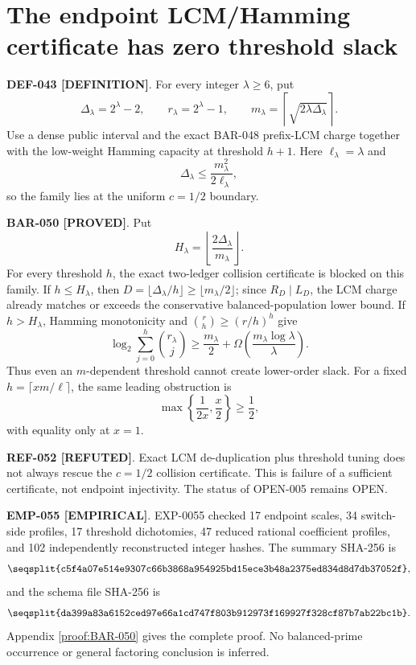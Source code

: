 \documentclass[11pt]{article}
\newcommand{\claimstatus}[2]{\textbf{#1 [#2]}}
\begin{document}
\section{The endpoint LCM/Hamming certificate has zero threshold slack}

\claimstatus{DEF-043}{DEFINITION}. For every integer \(\lambda\ge6\), put
\[
\Delta_\lambda=2^\lambda-2,\qquad
r_\lambda=2^\lambda-1,\qquad
m_\lambda=\left\lceil\sqrt{2\lambda\Delta_\lambda}\right\rceil.
\tag{M57.1}
\]
Use a dense public interval and the exact BAR-048 prefix-LCM charge together
with the low-weight Hamming capacity at threshold \(h+1\). Here
\(\ell_\lambda=\lambda\) and
\[
\Delta_\lambda\le\frac{m_\lambda^2}{2\ell_\lambda},
\tag{M57.2}
\]
so the family lies at the uniform \(c=1/2\) boundary.

\claimstatus{BAR-050}{PROVED}. Put
\[
H_\lambda=
\left\lfloor\frac{2\Delta_\lambda}{m_\lambda}\right\rfloor.
\tag{M57.3}
\]
For every threshold \(h\), the exact two-ledger collision certificate is
blocked on this family. If \(h\le H_\lambda\), then
\(D=\lfloor\Delta_\lambda/h\rfloor\ge\lfloor m_\lambda/2\rfloor\);
since \(R_D\mid L_D\), the LCM charge already matches or exceeds the
conservative balanced-population lower bound. If \(h>H_\lambda\), Hamming
monotonicity and \(\binom rh\ge(r/h)^h\) give
\[
\log_2\sum_{j=0}^{h}\binom{r_\lambda}{j}
\ge
\frac{m_\lambda}{2}
+\Omega\left(
\frac{m_\lambda\log\lambda}{\lambda}
\right).
\tag{M57.4}
\]
Thus even an \(m\)-dependent threshold cannot create lower-order slack.
For a fixed \(h=\lceil xm/\ell\rceil\), the same leading obstruction is
\[
\max\left\{\frac{1}{2x},\frac{x}{2}\right\}\ge\frac12,
\tag{M57.5}
\]
with equality only at \(x=1\).

\claimstatus{REF-052}{REFUTED}. Exact LCM de-duplication plus threshold
tuning does not always rescue the \(c=1/2\) collision certificate.
This is failure of a sufficient certificate, not endpoint injectivity.
The status of OPEN-005 remains OPEN.

\claimstatus{EMP-055}{EMPIRICAL}. EXP-0055 checked 17 endpoint scales,
34 switch-side profiles, 17 threshold dichotomies, 47 reduced rational
coefficient profiles, and 102 independently reconstructed integer hashes.
The summary SHA-256 is
\[
\texttt{\seqsplit{c5f4a07e514e9307c66b3868a954925bd15ece3b48a2375ed834d8d7db37052f}},
\]
and the schema file SHA-256 is
\[
\texttt{\seqsplit{da399a83a6152ced97e66a1cd747f803b912973f169927f328cf87b7ab22bc1b}}.
\]
Appendix \ref{proof:BAR-050} gives the complete proof. No balanced-prime
occurrence or general factoring conclusion is inferred.
\end{document}
